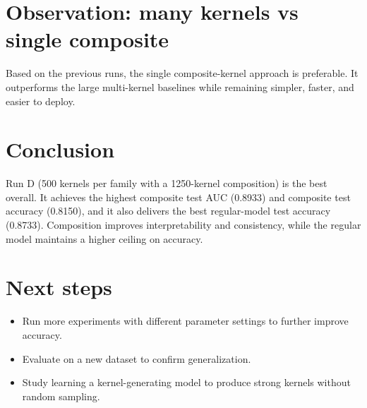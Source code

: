 \documentclass{article}
\begin{document}
\section*{Observation: many kernels vs single composite}
Based on the previous runs, the single composite-kernel approach is preferable. It outperforms the large multi-kernel baselines while remaining simpler, faster, and easier to deploy.

\section*{Conclusion}
Run D (500 kernels per family with a 1250-kernel composition) is the best overall. It achieves the highest composite test AUC (0.8933) and composite test accuracy (0.8150), and it also delivers the best regular-model test accuracy (0.8733). Composition improves interpretability and consistency, while the regular model maintains a higher ceiling on accuracy.

\section*{Next steps}
\begin{itemize}
    \item Run more experiments with different parameter settings to further improve accuracy.
    \item Evaluate on a new dataset to confirm generalization.
    \item Study learning a kernel-generating model to produce strong kernels without random sampling.
\end{itemize}
\end{document}
